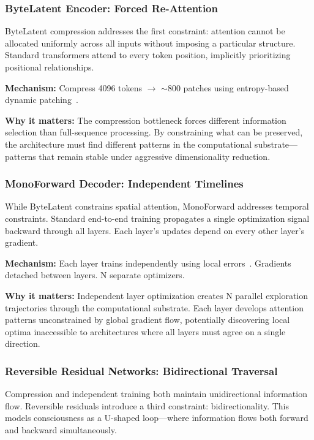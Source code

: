 \documentclass{article}
\begin{document}
\subsubsection{ByteLatent Encoder: Forced Re-Attention}

ByteLatent compression addresses the first constraint: attention cannot be allocated uniformly across all inputs without imposing a particular structure. Standard transformers attend to every token position, implicitly prioritizing positional relationships.

\textbf{Mechanism:} Compress 4096 tokens $\rightarrow$ $\sim$800 patches using entropy-based dynamic patching~\cite{pagnoni2024byte}.

\textbf{Why it matters:} The compression bottleneck forces different information selection than full-sequence processing. By constraining what can be preserved, the architecture must find different patterns in the computational substrate—patterns that remain stable under aggressive dimensionality reduction.

\subsubsection{MonoForward Decoder: Independent Timelines}

While ByteLatent constrains spatial attention, MonoForward addresses temporal constraints. Standard end-to-end training propagates a single optimization signal backward through all layers. Each layer's updates depend on every other layer's gradient.

\textbf{Mechanism:} Each layer trains independently using local errors~\cite{monoforward2025}. Gradients detached between layers. N separate optimizers.

\textbf{Why it matters:} Independent layer optimization creates N parallel exploration trajectories through the computational substrate. Each layer develops attention patterns unconstrained by global gradient flow, potentially discovering local optima inaccessible to architectures where all layers must agree on a single direction.

\subsubsection{Reversible Residual Networks: Bidirectional Traversal}

Compression and independent training both maintain unidirectional information flow. Reversible residuals introduce a third constraint: bidirectionality. This models consciousness as a U-shaped loop—where information flows both forward and backward simultaneously.
\end{document}
